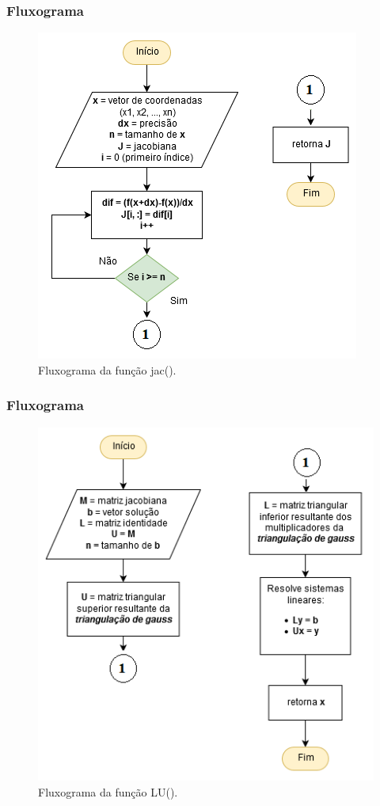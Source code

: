 \documentclass[aspectratio=1610]{beamer}
\begin{document}

\begin{frame}
\frametitle{Fluxograma}


\begin{figure}
  \centering
  \includegraphics[scale=0.6]{Imagens/diag_jac1.png}
  \caption{Fluxograma da função jac().}
\end{figure}


\end{frame}


\begin{frame}
\frametitle{Fluxograma}


\begin{figure}
  \centering
  \includegraphics[scale=0.6]{Imagens/diag_LU1.png}
  \caption{Fluxograma da função LU().}
\end{figure}


\end{frame}
\end{document}
